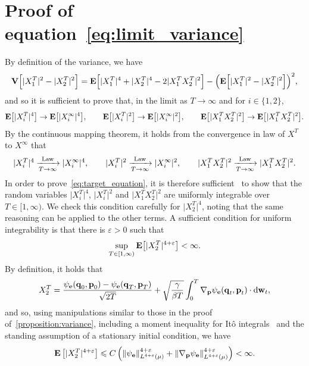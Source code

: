 \documentclass[11pt,a4paper]{article}
\begin{document}
\section{Proof of \texorpdfstring{equation~\eqref{eq:limit_variance}}{the limit of the variance}}%
\label{sec:proof_of_equation_variance}
By definition of the variance,
we have
\[
    \mathbf{V} \Bigl[ \lvert X^T_1 \rvert^2 - \lvert X^T_2 \rvert^2 \Bigr]
    = \mathbf{E} \Bigl[ \lvert X^T_1 \rvert^4 + \lvert X^T_2 \rvert^4 - 2 \lvert X^T_1 X^T_2 \rvert^2 \Bigr]
    - \Bigl( \mathbf{E} \Bigl[ \lvert X^T_1 \rvert^2 - \lvert X^T_2 \rvert^2 \Bigr] \Bigr)^2,
\]
and so it is sufficient to prove that,
in the limit as $T \to \infty$ and for $i \in \{1, 2\}$,
\begin{align}
    \label{eq:target_equation}
    \mathbf{E} \bigl[ \lvert X^T_i \rvert^4 \bigr]
    \to \mathbf{E} \bigl[ \lvert X^{\infty}_i \rvert^4 \bigr],
    \qquad
    \mathbf{E} \bigl[ \lvert X^T_i \rvert^2 \bigr]
    \to \mathbf{E} \bigl[ \lvert X^{\infty}_i \rvert^2 \bigr],
    \qquad
    \mathbf{E} \bigl[ \lvert X^T_1 X^T_2 \rvert^2 \bigr]
    \to \mathbf{E} \bigl[ \lvert X^T_1 X^T_2 \rvert^2 \bigr].
\end{align}
By the continuous mapping theorem,
it holds from the convergence in law of $X^{T}$ to $X^{\infty}$ that
\[
     \lvert X^T_i \rvert^4
    \xrightarrow[T \to \infty]{\rm Law}
    \lvert X^{\infty}_i \rvert^4 ,
    \qquad
     \lvert X^T_i \rvert^2
    \xrightarrow[T \to \infty]{\rm Law}
    \lvert X^{\infty}_i \rvert^2 ,
    \qquad
     \lvert X^T_1 X^T_2 \rvert^2
    \xrightarrow[T \to \infty]{\rm Law}
    \lvert X^T_1 X^T_2 \rvert^2 .
\]
In order to prove~\eqref{eq:target_equation},
it is therefore sufficient~\cite[Theorem 3.5]{MR1700749}
to show that the random variables $\lvert X^T_i \rvert^4$, $\lvert X^T_i \rvert^2$ and $\lvert X^T_1 X^T_2 \rvert^2$
are uniformly integrable over $T \in [1, \infty)$.
We check this condition carefully for $\lvert X^T_2 \rvert^4$,
noting that the same reasoning can be applied to the other terms.
A sufficient condition for uniform integrability is that there is $\varepsilon > 0$ such that
\[
    \sup_{T \in [1, \infty)} \mathbf{E} \bigl[ \lvert X^T_2 \rvert^{4+\varepsilon} \bigr] < \infty.
\]
By definition,
it holds that
\[
    X^T_2 =
    \frac{\psi_{\boldsymbol{\mathbf e}}(\boldsymbol{\mathbf q}_0, \boldsymbol{\mathbf p}_0) - \psi_{\boldsymbol{\mathbf e}}(\boldsymbol{\mathbf q}_T, \boldsymbol{\mathbf p}_T)}{\sqrt{2T}}
    + \sqrt{\frac{\gamma}{\beta T}} \int_{0}^{T} \nabla_{\boldsymbol{\mathbf p}} \psi_{\boldsymbol{\mathbf e}} (\boldsymbol{\mathbf q}_t, \boldsymbol{\mathbf p}_t) \cdot \mathrm d \boldsymbol{\mathbf w}_t,
\]
and so, using manipulations similar to those in the proof of~\cref{proposition:variance},
including a moment inequality for It\^o integrals~\cite[Theorem 7.1]{MR2380366} and the standing assumption of a stationary initial condition,
we have
\[
    \expect \left[ \lvert X^T_2 \rvert^{4+ \varepsilon} \right]
    \leq
    C \left( \norm{\psi_{\vect e}}[L^{4+\varepsilon}(\mu)]^{4 + \varepsilon} +
        \norm{\grad_{\vect p} \psi_{\vect e}}[L^{4+\varepsilon}(\mu)]^{4+\varepsilon}
        \right) < \infty.
\]
\end{document}
